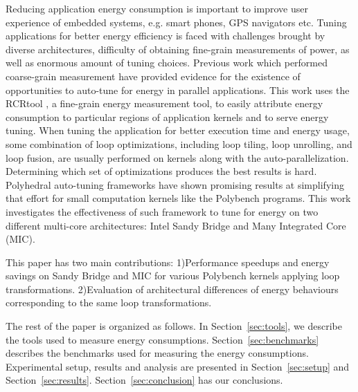 Reducing application energy consumption is important to improve user experience of 
embedded systems, e.g. smart phones, GPS navigators etc. 
Tuning applications for better energy efficiency is faced with challenges brought by
diverse architectures, difficulty of obtaining fine-grain measurements of power, 
as well as enormous amount of tuning choices.
Previous work which performed coarse-grain measurement have provided evidence for the 
existence of opportunities to auto-tune for energy in parallel applications\cite{Tiwari:EnergyAutoTune}.
This work uses the RCRtool \cite{us}, a fine-grain energy measurement tool, to easily attribute energy consumption to particular
regions of application kernels and to serve energy tuning. 
When tuning the application for
better execution time and energy usage, some combination of loop optimizations, including loop 
tiling, loop unrolling, and loop fusion, are usually performed on kernels along with the auto-parallelization.
Determining which set of optimizations produces the best results is hard.
Polyhedral auto-tuning frameworks have shown promising results at simplifying that effort\cite{EJ2012}
for small computation kernels like the Polybench programs. 
This work investigates the effectiveness of such framework to tune for 
energy on two different multi-core architectures: Intel Sandy Bridge
and Many Integrated Core (MIC).
 
This paper has two main contributions: 
1)Performance speedups and energy savings on Sandy Bridge and MIC for 
various Polybench kernels applying loop transformations. 
2)Evaluation of architectural differences of energy behaviours corresponding to the same loop transformations.

The rest of the paper is organized as follows. In Section~\ref{sec:tools}, we describe the tools
used to measure energy consumptions. Section~\ref{sec:benchmarks} describes the benchmarks used for  
measuring the energy consumptions. Experimental setup, results and analysis are presented in Section~\ref{sec:setup} and Section~\ref{sec:results}. Section~\ref{sec:conclusion} has our conclusions.

